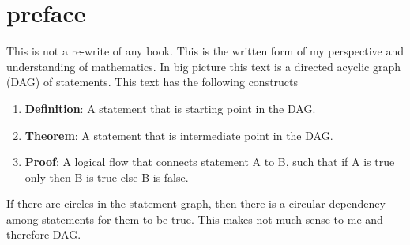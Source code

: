 \documentclass[./main.tex]{subfiles}
\begin{document}
\chapter*{preface}
This is not a re-write of any book.
This is the written form of my perspective and understanding of mathematics.
In big picture this text is a directed acyclic graph (DAG) of statements.
This text has the following constructs
\begin{enumerate}
  \item \textbf{Definition}: A statement that is starting point in the DAG.
  \item \textbf{Theorem}: A statement that is intermediate point in the DAG.
  \item \textbf{Proof}: A logical flow that connects statement A to B, such that if A is true only then B is true else B is false.
\end{enumerate}

If there are circles in the statement graph, then there is a circular dependency among statements for them to be true. This makes not much sense to me and therefore DAG.
\end{document}
